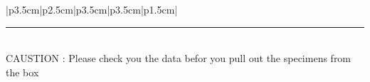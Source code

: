 \documentclass{article}
\newcommand*{\Data}[1]{%
  
    #1\\ 
    \hline
}%
\begin{document}
\begin{MyTabularX}{|p{3.5cm}|p{2.5cm}|p{3.5cm}|p{3.5cm}|p{1.5cm}|}


\end{MyTabularX}

\textcolor{black}{\rule{17cm}{1mm}} \\
CAUSTION : Please check you the data befor you pull out the specimens from the box
\end{document}
